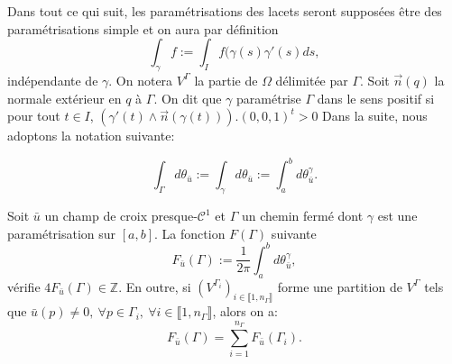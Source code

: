 Dans tout ce qui suit, les paramétrisations des lacets seront supposées être des paramétrisations simple et on aura par définition
$$
\int_\gamma f:=\int_If(\gamma(s)\gamma'(s)ds,
$$
indépendante de $\gamma$. On notera $V^\Gamma$ la partie de $\Omega$ délimitée par $\Gamma$. Soit $\overrightarrow{n}(q)$ la normale extérieur en $q$ à $\Gamma$. On dit que $\gamma$ paramétrise $\Gamma$ dans le sens positif si pour tout $t\in I$, $(\gamma'(t)\wedge\overrightarrow{n}(\gamma(t))).(0,0,1)^t>0$ Dans la suite, nous adoptons la notation suivante:

$$
\int_\Gamma d\theta_{\bar{u}}:=\int_\gamma d\theta_{\bar{u}}:=\int_a^b d\theta_{\bar{u}}^\gamma.
$$

\begin{lemma}
    \label{lem:index_saga_first}
    Soit $\bar{u}$ un champ de croix presque-$\mathcal{C}^1$ et $\Gamma$ un chemin fermé dont $\gamma$ est une paramétrisation sur $[a,b]$. La fonction $F(\Gamma)$ suivante
    $$
    F_{\bar{u}}(\Gamma):=\frac{1}{2\pi}\int_a^b d\theta_{\bar{u}}^\gamma,
    $$
    vérifie $4F_{\bar{u}}(\Gamma)\in\mathbb{Z}$. En outre, si $(V^{\Gamma_i})_{i\in\llbracket 1, n_\Gamma\rrbracket}$ forme une partition de $V^\Gamma$ tels que $\bar{u}(p)\neq 0,~\forall p\in\Gamma_i,~\forall i\in\llbracket 1, n_\Gamma\rrbracket$, alors on a:
    \begin{equation}
        F_{\bar{u}}(\Gamma)=\sum_{i=1}^{n_\Gamma}F_{\bar{u}}(\Gamma_i).
        \label{eqn:sum_F_u}
    \end{equation}
\end{lemma}

